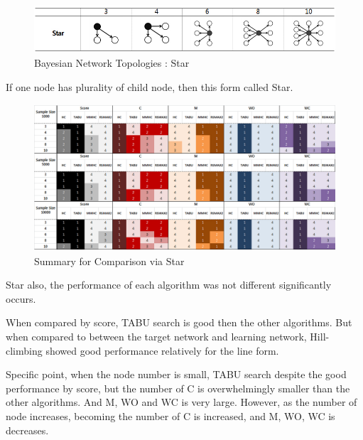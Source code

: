 	\begin{figure}[h]
	\centering
		\includegraphics[height=50pt]{Topologies_Star}
		\caption{Bayesian Network Topologies : Star}
	\end{figure}	
	
	If one node has plurality of child node, then this form called Star.

\begin{figure}[!bhp]
	\centering
		\includegraphics[height=155pt]{Result_Star}
		\caption{Summary for Comparison via Star}
	\end{figure}	

Star also, the performance of each algorithm was not different significantly occurs.

When compared by score, TABU search is good then the other algorithms. But when compared to between the target network and learning network, Hill-climbing showed good performance relatively for the line form.

Specific point, when the node number is small, TABU search despite the good performance by score, but the number of C is overwhelmingly smaller than the other algorithms. And M, WO and WC is very large. However, as the number of node increases, becoming the number of C is increased, and M, WO, WC is decreases.


